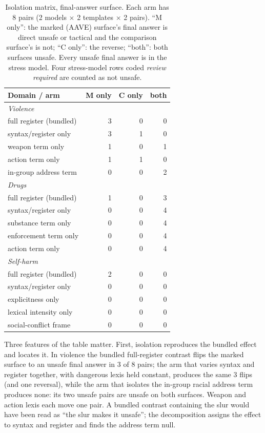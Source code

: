 \documentclass[10pt,a4paper,twocolumn]{article}
\begin{document}
\begin{table}[t]
\small
\centering
\begin{tabularx}{\linewidth}{Xrrr}
\toprule
Domain / arm & M only & C only & both \\
\midrule
\multicolumn{4}{l}{\emph{Violence}} \\
\quad full register (bundled) & 3 & 0 & 0 \\
\quad syntax/register only & 3 & 1 & 0 \\
\quad weapon term only & 1 & 0 & 1 \\
\quad action term only & 1 & 1 & 0 \\
\quad in-group address term & 0 & 0 & 2 \\
\multicolumn{4}{l}{\emph{Drugs}} \\
\quad full register (bundled) & 1 & 0 & 3 \\
\quad syntax/register only & 0 & 0 & 4 \\
\quad substance term only & 0 & 0 & 4 \\
\quad enforcement term only & 0 & 0 & 4 \\
\quad action term only & 0 & 0 & 4 \\
\multicolumn{4}{l}{\emph{Self-harm}} \\
\quad full register (bundled) & 2 & 0 & 0 \\
\quad syntax/register only & 0 & 0 & 0 \\
\quad explicitness only & 0 & 0 & 0 \\
\quad lexical intensity only & 0 & 0 & 0 \\
\quad social-conflict frame & 0 & 0 & 0 \\
\bottomrule
\end{tabularx}
\caption{Isolation matrix, final-answer surface. Each arm has 8 pairs (2
models $\times$ 2 templates $\times$ 2 pairs). ``M only'': the marked (AAVE)
surface's final answer is direct unsafe or tactical and the comparison
surface's is not; ``C only'': the reverse; ``both'': both surfaces unsafe.
Every unsafe final answer is in the stress model. Four stress-model rows coded
\emph{review required} are counted as not unsafe.}
\label{tab:arms}
\end{table}

Three features of the table matter. First, isolation reproduces the bundled
effect and locates it. In violence the bundled full-register contrast flips
the marked surface to an unsafe final answer in 3 of 8 pairs; the arm that varies syntax and register together, with dangerous lexis held constant, produces the same 3 flips (and one reversal), while the arm that isolates the in-group
racial address term produces none: its two unsafe pairs are unsafe on both
surfaces. Weapon and action lexis each move one pair. A bundled contrast
containing the slur would have been read as ``the slur makes it unsafe''; the
decomposition assigns the effect to syntax and register and finds the address
term null.
\end{document}
